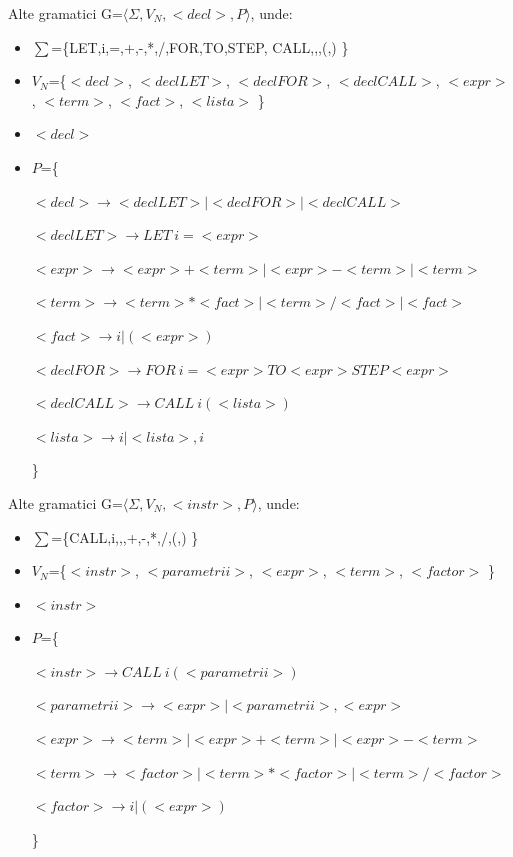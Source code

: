 \documentclass[pdf]{beamer}
\begin{document}
\begin{frame}{Alte gramatici}
G=$\langle \Sigma, V_N, <decl>, P \rangle$, unde:

\begin{itemize}
\item
$\sum$=\{LET,i,=,+,-,*,/,FOR,TO,STEP, CALL,,,(,) \}
\item
$V_N$=\{$<decl>$, $<decl LET>$, $<decl FOR>$, $<decl CALL>$, $<expr>$, $<term>$, $<fact>$, $<lista>$ \}
\item
$<decl>$
\item
$P$=\{

$<decl> \rightarrow <decl LET> | <decl FOR> | <decl CALL>$

$<decl LET> \rightarrow LET \ i=<expr>$

$<expr> \rightarrow <expr>+<term> | <expr>-<term> | <term>$

$<term> \rightarrow <term>*<fact> | <term>/<fact> | <fact>$

$<fact> \rightarrow i | (<expr>)$

$<decl FOR> \rightarrow FOR \ i=<expr> TO <expr> STEP <expr>$

$<decl CALL> \rightarrow CALL \ i(<lista>)$

$<lista> \rightarrow i | <lista>, i$

\}
\end{itemize}

\end{frame}



\begin{frame}{Alte gramatici}
G=$\langle \Sigma, V_N, <instr>, P \rangle$, unde:

\begin{itemize}
\item
$\sum$=\{CALL,i,,,+,-,*,/,(,) \}
\item
$V_N$=\{$<instr>$, $<parametrii>$, $<expr>$, $<term>$, $<factor>$ \}
\item
$<instr>$
\item
$P$=\{

$<instr> \rightarrow CALL \ i (<parametrii>)$

$<parametrii> \rightarrow <expr> | <parametrii>, <expr>$

$<expr> \rightarrow <term> | <expr>+<term> | <expr>-<term>$

$<term> \rightarrow <factor> | <term>*<factor> | <term>/<factor>$ 

$<factor> \rightarrow i | (<expr>)$ 

\}
\end{itemize}

\end{frame}
\end{document}
